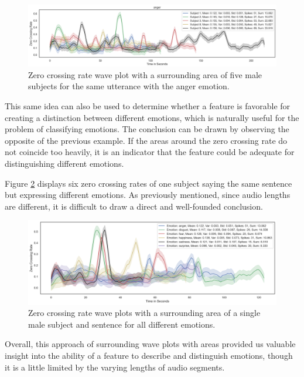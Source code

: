 \begin{figure}[H]
	\centering
	\includegraphics[width=1\linewidth]{figs/4_1_traditional/zcrAreaOnly1.png}
	\caption{Zero crossing rate wave plot with a surrounding area of five male subjects for the same utterance with the anger emotion.}
	\label{fig:zcrAreaOnly1}
\end{figure}

This same idea can also be used to determine whether a feature is favorable for creating a distinction between different emotions, which is naturally useful for the problem of classifying emotions. The conclusion can be drawn by observing the opposite of the previous example. If the areas around the zero crossing rate do not coincide too heavily, it is an indicator that the feature could be adequate for distinguishing different emotions.

Figure \ref{fig:zcrAreaSameSubj} displays six zero crossing rates of one subject saying the same sentence but expressing different emotions. As previously mentioned, since audio lengths are different, it is difficult to draw a direct and well-founded conclusion.

\begin{figure}[H]
	\centering
	\includegraphics[width=\linewidth]{figs/4_1_traditional/zcr_male_same_subject.png}
	\caption{Zero crossing rate wave plots with a surrounding area of a single male subject and sentence for all different emotions.}
	\label{fig:zcrAreaSameSubj}
\end{figure}

Overall, this approach of surrounding wave plots with areas provided us valuable insight into the ability of a feature to describe and distinguish emotions, though it is a little limited by the varying lengths of audio segments.

